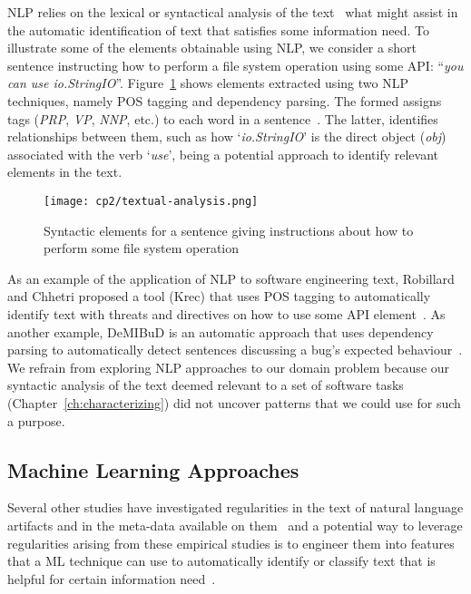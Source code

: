 \acf{NLP} relies on the lexical or syntactical analysis of the text~\cite{jurafsky2014speech}
what might assist in the automatic identification of text that satisfies some information need. 
To illustrate some of the elements obtainable using \acs{NLP}, we consider a short sentence 
instructing how to perform a file system operation using some API: ``\textit{you can use io.StringIO}''.
Figure~\ref{fig:nlp-analysis} shows elements extracted using two \acs{NLP} techniques,
namely \acf{POS} tagging and dependency parsing.
The formed assigns tags  ({\small \textit{PRP}, \textit{VP}, \textit{NNP},} etc.) to each word 
in a sentence~\cite{taylor2003penn}. The latter, identifies
relationships between them, such as how 
`\textit{io.StringIO}' is the direct object (\textit{obj})
associated with the verb `\textit{use}', 
being a potential approach to identify relevant elements in the text.



\medskip
\begin{figure}[h!]
    \centering
    \texttt{[image: cp2/textual-analysis.png]}
    \caption{Syntactic elements for a sentence giving instructions about how to perform some file system operation}
    \label{fig:nlp-analysis}
\end{figure}


As an example of the application of \ac{NLP} to software engineering text,
Robillard  and Chhetri proposed a tool (Krec)
that uses \acs{POS} tagging to automatically 
identify text with threats and directives on how to use some API element~\cite{Robillard2015}.
As another example, {\small DeMIBuD}
is an automatic approach that uses dependency parsing
to automatically detect sentences discussing a bug's expected behaviour~\cite{Chaparro2017}.
We refrain from exploring \acs{NLP} approaches to our domain problem because 
our syntactic analysis of the text deemed relevant to a set of software tasks (Chapter~\ref{ch:characterizing})
did not uncover patterns that we could use for such a purpose.



\subsection{Machine Learning Approaches}
\label{cp2:machine-learning}



Several other studies have investigated regularities in the text 
of natural language artifacts and 
in the meta-data available on them~\cite{Ko2006, Maalej2013, Arya2019}
and a potential way to leverage regularities arising from these empirical studies
is to engineer them into 
features that a  \acf{ML} technique can use to automatically identify or classify
text that is helpful for certain information need~\cite{Bavota2016}. 



